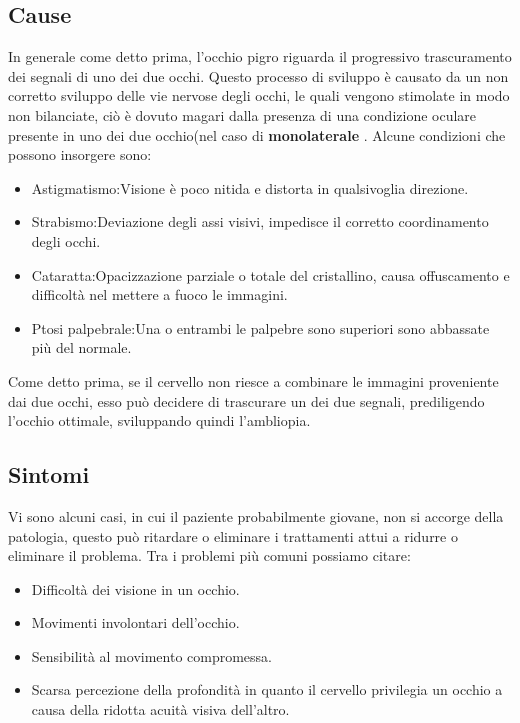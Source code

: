 \documentclass[10pt,a4paper]{article}
\begin{document}
	\subsection{Cause}
	In generale come detto prima, l'occhio pigro riguarda il progressivo trascuramento dei segnali di uno dei due occhi.
	Questo processo di sviluppo è causato da un non corretto sviluppo delle vie nervose degli occhi, le quali vengono stimolate in modo non bilanciate, ciò è dovuto magari dalla presenza di una condizione oculare presente in uno dei due occhio(nel caso di \textbf{monolaterale }.
	Alcune condizioni che possono insorgere sono:
	\begin{itemize}
		\item Astigmatismo:Visione è poco nitida e distorta in qualsivoglia direzione.
		\item Strabismo:Deviazione degli assi visivi, impedisce il corretto coordinamento degli occhi. 
		\item Cataratta:Opacizzazione parziale o totale del cristallino,  causa offuscamento e difficoltà nel mettere a fuoco le immagini.
		\item Ptosi palpebrale:Una o entrambi le palpebre sono superiori sono abbassate più del normale.
	\end{itemize}
	Come detto prima, se il cervello non riesce a combinare le immagini proveniente dai due occhi, esso può decidere di trascurare un dei due segnali, prediligendo l'occhio ottimale, sviluppando quindi l'ambliopia.
	\subsection{Sintomi}
	Vi sono alcuni casi, in cui il paziente probabilmente giovane, non si accorge della patologia, questo può ritardare o eliminare i trattamenti attui a ridurre o eliminare il problema.
	Tra i problemi più comuni possiamo citare:	   
	\begin{itemize}
		\item Difficoltà dei visione in un occhio.
		\item Movimenti involontari dell'occhio.
		\item Sensibilità al movimento compromessa.
		\item Scarsa percezione della profondità in quanto il cervello privilegia un occhio a causa della ridotta acuità visiva dell'altro.
	\end{itemize} 
\newpage   
\end{document}
